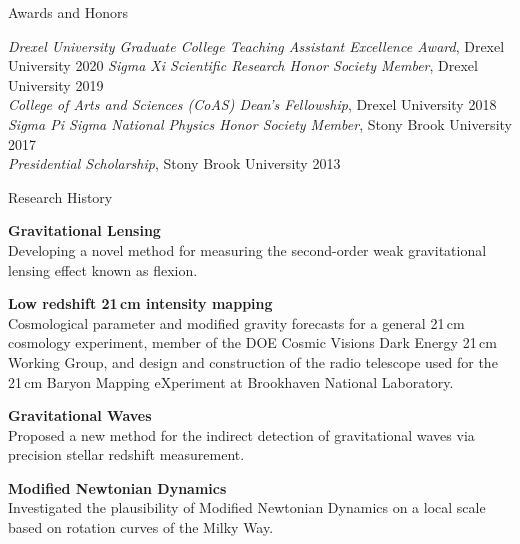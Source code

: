 \documentclass{resume} %
\begin{document}

\begin{rSection}{Awards and Honors}

\textit{Drexel University Graduate College Teaching Assistant Excellence Award}, Drexel University \hfill{2020}
\textit{Sigma Xi Scientific Research Honor Society Member}, Drexel University \hfill{2019}\\
\textit{College of Arts and Sciences (CoAS) Dean's Fellowship}, Drexel University \hfill {2018}\\
\textit{Sigma Pi Sigma National Physics Honor Society Member}, Stony Brook University \hfill{2017}\\
\textit{Presidential Scholarship}, Stony Brook University \hfill {2013}

\end{rSection}


\begin{rSection}{Research History}

\begin{description}[leftmargin=8em, style=nextline]

\item[\textnormal{2018 -- Present}] \textbf{Gravitational Lensing}\\
Developing a novel method for measuring the second-order weak gravitational lensing effect known as flexion. 
\item[\textnormal{2015 -- Present}] \textbf{Low redshift 21$\,$cm intensity mapping}\\
 Cosmological parameter and modified gravity forecasts for a general 21$\,$cm cosmology 
 experiment, member of the DOE Cosmic Visions Dark Energy 21$\,$cm Working Group, and design and construction
 of the radio telescope used for the 21$\,$cm Baryon Mapping eXperiment at Brookhaven National
 Laboratory.
\item[\textnormal{2013}] \textbf{Gravitational Waves}\\
 Proposed a new method for the indirect detection of gravitational waves via precision 
 stellar redshift measurement.
\item[\textnormal{2012}] \textbf{Modified Newtonian Dynamics}\\
 Investigated the plausibility of Modified Newtonian Dynamics on a local scale based on
 rotation curves of the Milky Way.

\end{description}

\end{rSection}
\end{document}
